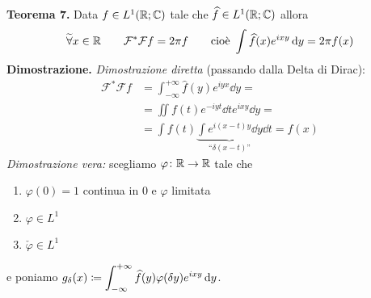 \textbf{Teorema 7.}
Data $f \in L^1(\mathbb R; \mathbb C)$ tale che $\widehat f \in L^1(\mathbb R; \mathbb C)$ allora
$$
\widetilde\forall x \in \mathbb R
\qquad
\mathcal F^* \mathcal F f = 2 \pi f
\qquad
\text{cioè }
\int \widehat f(x) e^{ixy} \,\mathrm{d} y = 2\pi f(x)
$$
\textbf{Dimostrazione.}
\textit{Dimostrazione diretta} (passando dalla Delta di Dirac):
$$
\begin{aligned}
	\mathcal F^* \mathcal F f 
	&= \int_{-\infty}^{+\infty} \hat f(y) e^{iyx} \dd y = \\
	&= \iint f(t) e^{-iyt} \dd t e^{ixy} \dd y = \\
	&= \int f(t) \underbrace{\int e^{i(x-t)y} \dd y}_{\text{``$\delta(x-t)$''}} \dd t = f(x)
\end{aligned}
$$
\textit{Dimostrazione vera:} scegliamo $\varphi \colon \mathbb R \to \mathbb R$ tale che
\begin{enumerate}
	\item $\varphi(0) = 1$ continua in $0$ e $\varphi$ limitata
	\item $\varphi \in L^1$
	\item $\check\varphi \in L^1$
\end{enumerate}
e poniamo $g_\delta(x) \coloneqq \displaystyle \int_{-\infty}^{+\infty} \widehat f(y) \varphi(\delta y) e^{ixy} \,\mathrm{d} y$.
